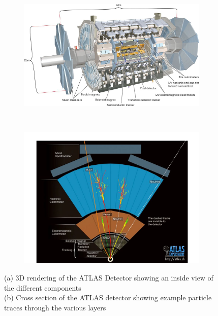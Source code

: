 \begin{figure}[H]
    \centering
    \begin{subfigure}[b]{0.48\textwidth}
        \centering
        \includegraphics[width=\textwidth]{Pictures/ATLASopen.jpg}
    \caption{}
    \end{subfigure}
    ~
    \begin{subfigure}[b]{0.48\textwidth}
        \centering
        \includegraphics[width=\textwidth]{Pictures/ATLAS-X-sec.png}
    \caption{}    
        \end{subfigure}
\caption{(a) 3D rendering of the ATLAS Detector showing an inside view of the different components \\ (b) Cross section of the ATLAS detector showing example particle traces through the various layers}
\label{fig:ATLAS}
\end{figure}


